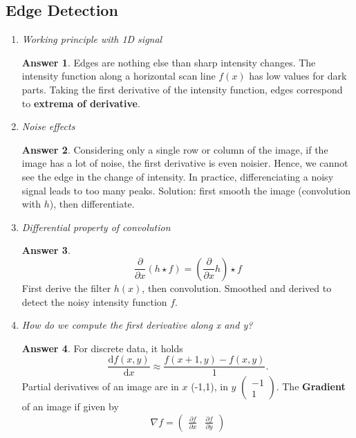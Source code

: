 \documentclass[a4paper,12 pt]{article}
\theoremstyle{definition}
\theoremstyle{remark}
\theoremstyle{definition}
\theoremstyle{definition}
\theoremstyle{definition}
\theoremstyle{definition}
\theoremstyle{remark}
\theoremstyle{remark}
\theoremstyle{definition}
\theoremstyle{definition}
\newtheorem*{answer}{Answer}
\begin{document}
\subsection*{Edge Detection}
\begin{enumerate}
\item \textit{Working principle with 1D signal}
\begin{answer}
Edges are nothing else than sharp intensity changes. The intensity function along a horizontal scan line $f(x)$ has low values for dark parts. Taking the first derivative of the intensity function, edges correspond to \textbf{extrema of derivative}.
\end{answer}
\item \textit{Noise effects}
\begin{answer}
Considering only a single row or column of the image, if the image has a lot of noise, the first derivative is even noisier. Hence, we cannot see the edge in the change of intensity. In practice, differenciating a noisy signal leads to too many peaks. Solution: first smooth the image (convolution with $h$), then differentiate.
\end{answer}
\item \textit{Differential property of convolution}
\begin{answer}
\begin{equation}
\frac{\partial}{\partial x}(h\star f) = (\frac{\partial}{\partial x}h) \star f
\end{equation}
First derive the filter $h(x)$, then convolution. Smoothed and derived to detect the noisy intensity function $f$.
\end{answer}
\item \textit{How do we compute the first derivative along x and y?}
\begin{answer}
For discrete data, it holds
\begin{equation}
\frac{\text{d}f(x,y)}{\text{d}x}\approx \frac{f(x+1,y)-f(x,y)}{1}.
\end{equation}
Partial derivatives of an image are in $x$ (-1,1), in $y$ $\begin{pmatrix} -1\\1 \end{pmatrix}$. 
The \textbf{Gradient} of an image if given by 
\begin{equation}
\nabla f=\begin{pmatrix} 
\frac{\partial f}{\partial x}&\frac{\partial f}{\partial y}
\end{pmatrix}
\end{equation}

\end{answer}
\end{enumerate}
\end{document}
